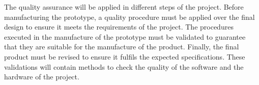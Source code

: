 The quality assurance will be applied in different steps of the project. Before manufacturing the prototype, a quality procedure must be applied over the final design to ensure it meets the requirements of the project. The procedures executed in the manufacture of the prototype must be validated to guarantee that they are suitable for the manufacture of the product. Finally, the final product must be revised to ensure it fulfils the expected specifications. These validations will contain methods to check the quality of the software and the hardware of the project.
